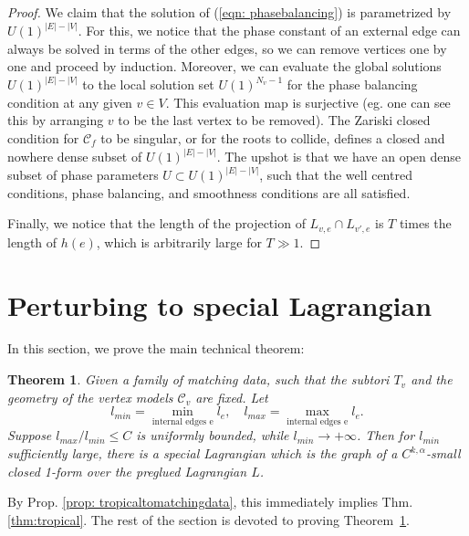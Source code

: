 \documentclass{article}
\newtheorem{thm}{Theorem}[section]
\theoremstyle{definition}
\begin{document}
\begin{proof}
		
		We claim that the solution of (\ref{eqn: phasebalancing}) is parametrized by $U(1)^{|E|-|V|}$. For this, we notice that the phase constant of an external edge can always be solved in terms of the other edges, so we can remove vertices one by one and proceed by induction. Moreover, we can evaluate the global solutions $U(1)^{|E|-|V|}$ to the local solution set $U(1)^{N_v-1}$ for the phase balancing condition at any given $v\in V$. This evaluation map is surjective (eg. one can see this by arranging $v$ to be the last vertex to be removed). The Zariski closed condition for $\mathcal{C}_f$ to be singular, or for the roots to collide, defines a closed and nowhere dense subset of $U(1)^{|E|-|V|}$. The upshot is that we have an open dense subset of phase parameters $U\subset U(1)^{|E|-|V|}$, such that the well centred conditions, phase balancing, and smoothness conditions are all satisfied. 
		
		Finally, we notice that the length of the projection of $L_{v,e}\cap L_{v',e}$ is $T$ times the length of $h(e)$, which is arbitrarily large for $T\gg 1$.
	\end{proof}
	
	
	
	
	
	
	\section{Perturbing to special Lagrangian}\label{sec: perturbation}
	
	In this section, we prove the main technical theorem:
	
	
	
	\begin{thm}\label{thm:main}
	Given a family of matching data, such that the subtori $T_v$ and the geometry of the vertex models $\mathcal{C}_v$ are fixed. Let
	\[
		l_{min}= \min_{\text{internal edges e}} l_e,\quad 	l_{max}= \max_{\text{internal edges e}} l_e.
	\]
	Suppose $l_{max}/l_{min}\leq C$ is uniformly bounded, while $l_{min}\to +\infty$.  
	Then for $l_{min}$ sufficiently large, there is a special Lagrangian which is the graph of a $C^{k,\alpha}$-small closed 1-form over the preglued Lagrangian $L$.
	\end{thm}
	
	
	
	
	
By Prop. \ref{prop: tropicaltomatchingdata}, this immediately implies Thm. \ref{thm:tropical}.
The rest of the section is devoted to proving
	Theorem~\ref{thm:main}.
	
\end{document}
